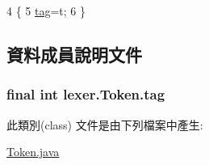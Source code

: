 \begin{DoxyCode}
4                         \{
5         \hyperlink{classlexer_1_1_token_a53e09da48c3c975277779c52b3597606}{tag}=t;
6     \}
\end{DoxyCode}


\subsection{資料成員說明文件}
\subsubsection[{\texorpdfstring{tag}{tag}}]{\setlength{\rightskip}{0pt plus 5cm}final int lexer.\+Token.\+tag}\hypertarget{classlexer_1_1_token_a53e09da48c3c975277779c52b3597606}{}\label{classlexer_1_1_token_a53e09da48c3c975277779c52b3597606}


此類別(class) 文件是由下列檔案中產生\+:\begin{DoxyCompactItemize}
\item 
\hyperlink{_token_8java}{Token.\+java}\end{DoxyCompactItemize}
